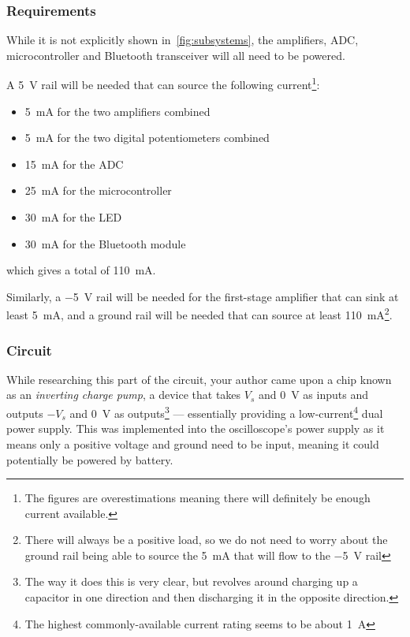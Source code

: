 \subsubsection*{Requirements}

While it is not explicitly shown in~\cref{fig:subsystems}, the amplifiers, ADC,
microcontroller and Bluetooth transceiver will all need to be powered.

A \SI{5}{\V} rail will be needed that can source the following
current\footnote{The figures are overestimations meaning there will
definitely be enough current available.}:
\begin{itemize}
  \item \SI{5}{\mA} for the two amplifiers combined
  \item \SI{5}{\mA} for the two digital potentiometers combined
  \item \SI{15}{\mA} for the ADC
  \item \SI{25}{\mA} for the microcontroller
  \item \SI{30}{\mA} for the LED
  \item \SI{30}{\mA} for the Bluetooth module
\end{itemize}
which gives a total of \SI{110}{\mA}.

Similarly, a \SI{-5}{\V} rail will be needed for the first-stage amplifier that
can sink at least \SI{5}{\mA}, and a ground rail will be needed that can source
at least \SI{110}{\mA}\footnote{There will always be a positive load, so we do
  not need to worry about the ground rail being able to source the \SI{5}{\mA}
that will flow to the \SI{-5}{\V} rail}.

\subsubsection*{Circuit}

While researching this part of the circuit, your author came upon a chip known
as an \textit{inverting charge pump}, a device that takes $V_s$ and \SI{0}{\V}
as inputs and outputs $-V_s$ and \SI{0}{\V} as outputs\footnote{The way it does
  this is very clear, but revolves around charging up a capacitor in one
direction and then discharging it in the opposite direction.} --- essentially
providing a low-current\footnote{The highest commonly-available current rating
  seems to be about \SI{1}{\A}} dual power supply. This was implemented into the
  oscilloscope's power supply as it means only a positive voltage and ground
  need to be input, meaning it could potentially be powered by battery.

